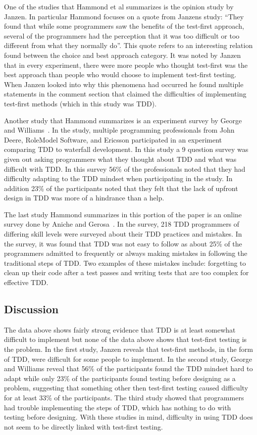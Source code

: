 \documentclass{sig-alternate}
\begin{document}
One of the studies that Hammond et al summarizes is the opinion study by Janzen.  In particular Hammond focuses on a quote from Janzens study: ``They found that while some programmers saw the benefits of the test-first approach, several of the programmers had the perception that it was too difficult or too different from what they normally do''.  This quote refers to an interesting relation found between the choice and best approach category.  It was noted by Janzen that in every experiment, there were more people who thought test-first was the best approach than people who would choose to implement test-first testing.  When Janzen looked into why this phenomena had occurred he found multiple statements in the comment section that claimed the difficulties of implementing test-first methods (which in this study was TDD).

Another study that Hammond summarizes is an experiment survey by George and Williams~\cite{George:2003}.  In the study, multiple programming professionals from John Deere, RoleModel Software, and Ericsson participated in an experiment comparing TDD to waterfall development.  In this study a 9 question survey was given out asking programmers what they thought about TDD and what was difficult with TDD.  In this survey 56\% of the professionals noted that they had difficulty adapting to the TDD mindset when participating in the study.  In addition 23\% of the participants noted that they felt that the lack of upfront design in TDD was more of a hindrance than a help. 

The last study Hammond summarizes in this portion of the paper is an online survey done by Aniche and Gerosa~\cite{Aniche:2010}.  In the survey, 218 TDD programmers of differing skill levels were surveyed about their TDD practices and mistakes.  In the survey, it was found that TDD was not easy to follow as about 25\% of the programmers admitted to frequently or always making mistakes in following the traditional steps of TDD.  Two examples of these mistakes include: forgetting to clean up their code after a test passes and writing tests that are too complex for effective TDD.
 
\subsection{Discussion}
The data above shows fairly strong evidence that TDD is at least somewhat difficult to implement but none of the data above shows that test-first testing is the problem.  In the first study, Janzen reveals that test-first methods, in the form of TDD, were difficult for some people to implement.  In the second study, George and Williams reveal that 56\% of the participants found the TDD mindset hard to adapt while only 23\% of the participants found testing before designing as a problem, suggesting that something other then test-first testing caused difficulty for at least 33\% of the participants.  The third study showed that programmers had trouble implementing the steps of TDD, which has nothing to do with testing before designing.  With these studies in mind, difficulty in using TDD does not seem to be directly linked with test-first testing.
\end{document}
